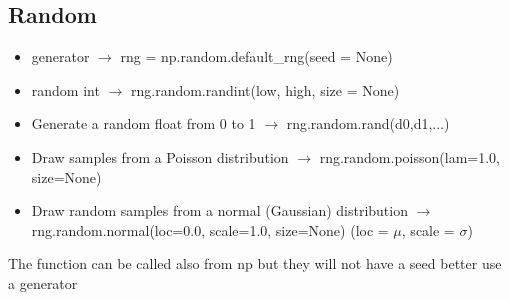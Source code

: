 \documentclass{article}
\begin{document}
\begin{multicols}{2}
\subsection{Random}
\begin{itemize}
\item generator  $\rightarrow$ rng = np.random.default\_rng(seed = None)
\item random int $\rightarrow$  rng.random.randint(low, high, size = None)
\item Generate a random float from 0 to 1 $\rightarrow$ rng.random.rand(d0,d1,...)
\item Draw samples from a Poisson distribution $\rightarrow$ rng.random.poisson(lam=1.0, size=None)
\item Draw random samples from a normal (Gaussian) distribution $\rightarrow$ rng.random.normal(loc=0.0, scale=1.0, size=None) (loc = $\mu$, scale = $\sigma$)
\end{itemize}
The function can be called also from np but they will not have a seed better use a generator


\end{multicols}
\end{document}
